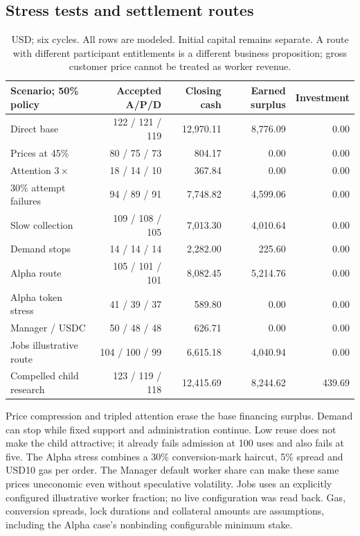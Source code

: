\subsection{Stress tests and settlement routes}
\begin{table}[H]\small\centering\begin{tabular}{lrrrr}\toprule
Scenario; 50\% policy & Accepted A/P/D & Closing cash & Earned surplus & Investment \\\midrule
Direct base & 122 / 121 / 119 & 12,970.11 & 8,776.09 & 0.00 \\
Prices at 45\% & 80 / 75 / 73 & 804.17 & 0.00 & 0.00 \\
Attention $3\times$ & 18 / 14 / 10 & 367.84 & 0.00 & 0.00 \\
30\% attempt failures & 94 / 89 / 91 & 7,748.82 & 4,599.06 & 0.00 \\
Slow collection & 109 / 108 / 105 & 7,013.30 & 4,010.64 & 0.00 \\
Demand stops & 14 / 14 / 14 & 2,282.00 & 225.60 & 0.00 \\
Alpha route & 105 / 101 / 101 & 8,082.45 & 5,214.76 & 0.00 \\
Alpha token stress & 41 / 39 / 37 & 589.80 & 0.00 & 0.00 \\
Manager / USDC & 50 / 48 / 48 & 626.71 & 0.00 & 0.00 \\
Jobs illustrative route & 104 / 100 / 99 & 6,615.18 & 4,040.94 & 0.00 \\
Compelled child research & 123 / 119 / 118 & 12,415.69 & 8,244.62 & 439.69 \\
\bottomrule\end{tabular}\caption{USD; six cycles. All rows are modeled. Initial capital remains separate. A route with different participant entitlements is a different business proposition; gross customer price cannot be treated as worker revenue.}\end{table}
Price compression and tripled attention erase the base financing surplus. Demand can stop while fixed support and administration continue. Low reuse does not make the child attractive; it already fails admission at 100 uses and also fails at five. The Alpha stress combines a 30\% conversion-mark haircut, 5\% spread and USD10 gas per order. The Manager default worker share can make these same prices uneconomic even without speculative volatility. Jobs uses an explicitly configured illustrative worker fraction; no live configuration was read back. Gas, conversion spreads, lock durations and collateral amounts are assumptions, including the Alpha case's nonbinding configurable minimum stake.
